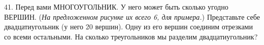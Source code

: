 41. Перед вами МНОГОУГОЛЬНИК. У него может быть сколько угодно ВЕРШИН. ({\it На предложенном рисунке их всего 6, для примера.}) Представьте себе двадцатиугольник (у него 20 вершин). Одну из его вершин соединим отрезками со всеми остальными. На сколько треугольников мы разделим двадцатиугольник?
\begin{center}
\begin{figure}[ht!]
\end{figure}
\end{center}

